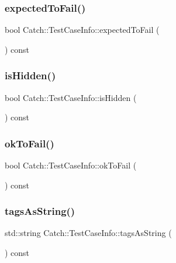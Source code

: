 \subsubsection{\texorpdfstring{expectedToFail()}{expectedToFail()}}
{\footnotesize\ttfamily bool Catch\+::\+Test\+Case\+Info\+::expected\+To\+Fail (\begin{DoxyParamCaption}{ }\end{DoxyParamCaption}) const}

\mbox{\label{struct_catch_1_1_test_case_info_a934b1a0952700743e99d62ec1731a2e2}} 
\subsubsection{\texorpdfstring{isHidden()}{isHidden()}}
{\footnotesize\ttfamily bool Catch\+::\+Test\+Case\+Info\+::is\+Hidden (\begin{DoxyParamCaption}{ }\end{DoxyParamCaption}) const}

\mbox{\label{struct_catch_1_1_test_case_info_a5f37291295e3a6de2dd85324c941edaf}} 
\subsubsection{\texorpdfstring{okToFail()}{okToFail()}}
{\footnotesize\ttfamily bool Catch\+::\+Test\+Case\+Info\+::ok\+To\+Fail (\begin{DoxyParamCaption}{ }\end{DoxyParamCaption}) const}

\mbox{\label{struct_catch_1_1_test_case_info_a17506de67fb18e27511c17f8a81119d8}} 
\subsubsection{\texorpdfstring{tagsAsString()}{tagsAsString()}}
{\footnotesize\ttfamily std\+::string Catch\+::\+Test\+Case\+Info\+::tags\+As\+String (\begin{DoxyParamCaption}{ }\end{DoxyParamCaption}) const}

